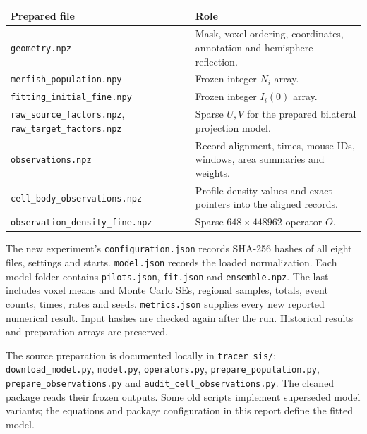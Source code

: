 \documentclass[10pt]{article}
\begin{document}
\begin{center}\small
\begin{tabular}{>{\raggedright\arraybackslash}p{.43\linewidth}>{\raggedright\arraybackslash}p{.49\linewidth}}\toprule
Prepared file & Role\\\midrule
\texttt{geometry.npz} & Mask, voxel ordering, coordinates, annotation and hemisphere reflection.\\
\texttt{merfish\_population.npy} & Frozen integer $N_i$ array.\\
\texttt{fitting\_initial\_fine.npy} & Frozen integer $I_i(0)$ array.\\
\texttt{raw\_source\_factors.npz}, \texttt{raw\_target\_factors.npz} & Sparse $U,V$ for the prepared bilateral projection model.\\
\texttt{observations.npz} & Record alignment, times, mouse IDs, windows, area summaries and weights.\\
\texttt{cell\_body\_observations.npz} & Profile-density values and exact pointers into the aligned records.\\
\texttt{observation\_density\_fine.npz} & Sparse $648\times448962$ operator $O$.\\\bottomrule
\end{tabular}
\end{center}
The new experiment's \texttt{configuration.json} records SHA-256 hashes of all eight files, settings and starts. \texttt{model.json} records the loaded normalization. Each model folder contains \texttt{pilots.json}, \texttt{fit.json} and \texttt{ensemble.npz}. The last includes voxel means and Monte Carlo SEs, regional samples, totals, event counts, times, rates and seeds. \texttt{metrics.json} supplies every new reported numerical result. Input hashes are checked again after the run. Historical results and preparation arrays are preserved.

The source preparation is documented locally in \texttt{tracer\_sis/}: \texttt{download\_model.py}, \texttt{model.py}, \texttt{operators.py}, \texttt{prepare\_population.py}, \texttt{prepare\_observations.py} and \texttt{audit\_cell\_observations.py}. The cleaned package reads their frozen outputs. Some old scripts implement superseded model variants; the equations and package configuration in this report define the fitted model.
\end{document}
